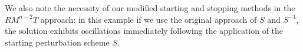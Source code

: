 We also note the necessity of our modified starting and stopping methods in the $RM^{n-2}T$ approach: in this
example if we use the original approach of $S$ and $S^{-1}$,
the solution exhibits oscillations immediately following the
application of the starting perturbation scheme $S$.






